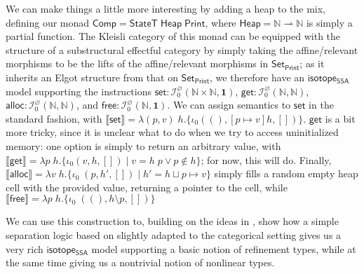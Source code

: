 \documentclass[acmsmall,screen,review]{acmart}
\newcommand{\mc}[1]{\ensuremath{\mathcal{#1}}}
\newcommand{\mb}[1]{\ensuremath{\mathbf{#1}}}
\newcommand{\ms}[1]{\ensuremath{\mathsf{#1}}}
\newcommand{\nats}{\mathbb{N}}
\newcommand{\dnt}[1]{\llbracket{#1}\rrbracket}
\newcommand{\isotopessa}{\ms{isotope_{SSA}}}
\begin{document}
We can make things a little more interesting by adding a heap to the mix,
defining our monad \(\ms{Comp} = \ms{StateT}\;\ms{Heap}\;\ms{Print}\), where
\(\ms{Heap} = \nats \rightharpoonup \nats\) is simply a partial function. The
Kleisli category of this monad can be equipped with the structure of a
substructural effectful category by simply taking the affine/relevant morphisms
to be the lifts of the affine/relevant morphisms in \(\ms{Set}_{\ms{Print}}\);
as it inherits an Elgot structure from that on \(\ms{Set}_{\ms{Print}}\), we
therefore have an \isotopessa model supporting the instructions \(\ms{set}:
\mc{I}^\varnothing_0(\nats \times \nats, \mb{1})\), \(\ms{get}:
\mc{I}^\varnothing_0(\nats, \nats)\), \(\ms{alloc}: \mc{I}^\varnothing_0(\nats,
\nats)\), and \(\ms{free}: \mc{I}^\varnothing_0(\nats, \mb{1})\). We can assign
semantics to \(\ms{set}\) in the standard fashion, with \(\dnt{\ms{set}} =
\lambda (p, v)\;h. \{\iota_0((), [p \mapsto v]h, [])\}\). \(\ms{get}\) is a bit
more tricky, since it is unclear what to do when we try to access uninitialized
memory: one option is simply to return an arbitrary value, with \(\dnt{\ms{get}}
= \lambda p\;h. \{\iota_0(v, h, []) \mid v = h\;p \lor p \notin h\}\); for now,
this will do. Finally, \(\dnt{\ms{alloc}} = \lambda v\;h.\{\iota_0\;(p, h', [])
\mid h' = h \sqcup p \mapsto v\}\) simply fills a random empty heap cell with
the provided value, returning a pointer to the cell, while \(\dnt{\ms{free}} =
\lambda p\;h. \{\iota_0\;((), h \setminus p, [])\}\)

We can use this construction to, building on the ideas in \cite{mellies-ftrs},
show how a simple separation logic based on \cite{reynolds-separation-2002}
slightly adapted to the categorical setting gives us a very rich \isotopessa
model supporting a basic notion of refinement types, while at the same time
giving us a nontrivial notion of nonlinear types.
\end{document}

